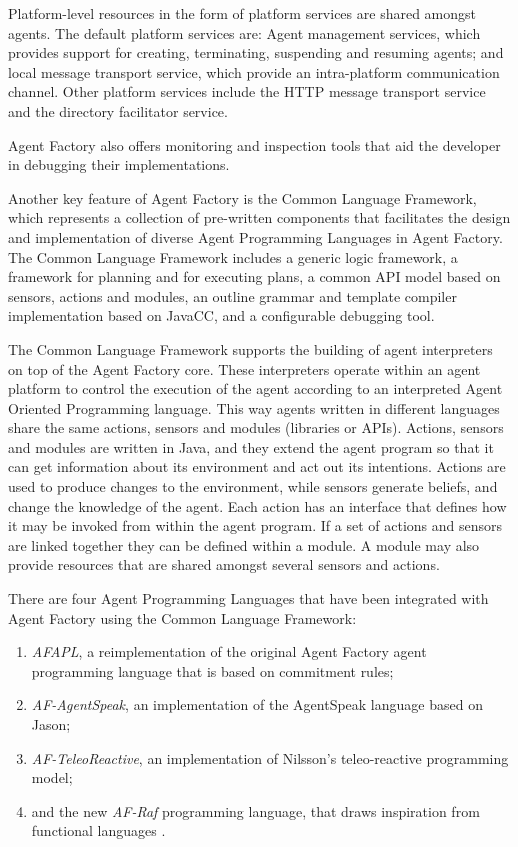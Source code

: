 \documentclass[a4paper,12pt,oneside,fleqn]{book} %
\begin{document}
Platform-level resources in the form of platform services are shared
amongst agents. The default platform services are: Agent management
services, which provides support for creating, terminating, suspending and
resuming agents; and local message transport service, which provide an
intra-platform communication channel. Other platform services include the
HTTP message transport service and the directory facilitator service.

Agent Factory also offers monitoring and inspection tools that aid the
developer in debugging their implementations.

Another key feature of Agent Factory is the Common Language Framework,
which represents a collection of pre-written components that facilitates
the design and implementation of diverse Agent Programming Languages in
Agent Factory\null. The Common Language Framework includes a generic logic
framework, a framework for planning and for executing plans, a common API
model based on sensors, actions and modules, an outline grammar and
template compiler implementation based on JavaCC, and a configurable
debugging tool.

The Common Language Framework supports the building of agent interpreters
on top of the Agent Factory core. These interpreters operate within an
agent platform to control the execution of the agent according to an
interpreted Agent Oriented Programming language. This way agents written in
different languages share the same actions, sensors and modules (libraries
or APIs). Actions, sensors and modules are written in Java, and they extend
the agent program so that it can get information about its environment and
act out its intentions. Actions are used to produce changes to the
environment, while sensors generate beliefs, and change the knowledge of
the agent. Each action has an interface that defines how it may be invoked
from within the agent program. If a set of actions and sensors are linked
together they can be defined within a module. A module may also provide
resources that are shared amongst several sensors and actions.

There are four Agent Programming Languages that have been integrated with
Agent Factory using the Common Language Framework: \begin{enumerate}

\item \textit{AFAPL}, a reimplementation of the original Agent Factory
agent programming language that is based on commitment rules;

\item \textit{AF-AgentSpeak}, an implementation of the AgentSpeak language based on Jason;

\item \textit{AF-TeleoReactive}, an implementation of Nilsson's teleo-reactive
programming model;

\item and the new \textit{AF-Raf} programming language, that draws
inspiration from functional languages .
\end{enumerate}
\end{document}
